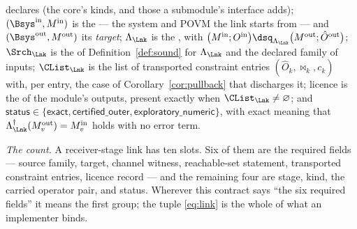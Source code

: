 \begin{definition}
declares (the core's kinds, and those a submodule's interface adds);
$(\Bsys^{\mathrm{in}},M^{\mathrm{in}})$ is the
--- the system and POVM the link starts from --- and
$(\Bsys^{\mathrm{out}},M^{\mathrm{out}})$ its \emph{target};
$\Lambda_{\Lnk}$ is the
,
with
$\big(M^{\mathrm{in}};O^{\mathrm{in}}\big)\dsq_{\Lambda_{\Lnk}}
\big(M^{\mathrm{out}};\hat O^{\mathrm{out}}\big)$;
$\Srch_{\Lnk}$ is the
of Definition~\ref{def:sound} for $\Lambda_{\Lnk}$ and the declared family of
inputs; $\CList_{\Lnk}$ is the list of transported constraint entries
$(\hat O_k,\bowtie_k,c_k)$ with, per entry, the  case of
Corollary~\ref{cor:pullback} that discharges it; \textsf{licence} is the
of the module's outputs, present exactly when $\CList_{\Lnk}\ne\varnothing$;
and $\textsf{status}\in\{\textsf{exact},\textsf{certified\_outer},
\textsf{exploratory\_numeric}\}$, with \textsf{exact} meaning that
$\Lambda_{\Lnk}^{\dagger}(M^{\mathrm{out}}_v)=M^{\mathrm{in}}_v$ holds with no
error term.

\emph{The count.} A receiver-stage link has ten slots. Six of
them are the required fields --- source family, target, channel witness,
reachable-set statement, transported constraint entries, licence record ---
and the remaining four are \textsf{stage}, \textsf{kind}, the carried
operator pair, and \textsf{status}. Wherever this contract says ``the six
required fields'' it means the first group; the tuple \eqref{eq:link} is the
whole of what an implementer binds.
\end{definition}
